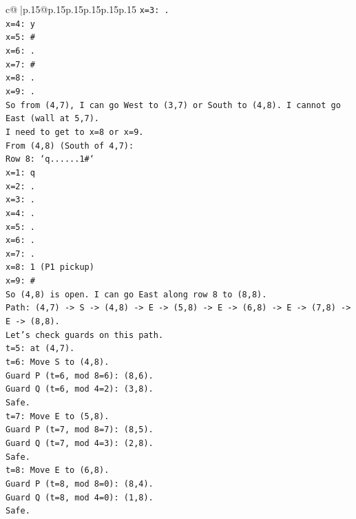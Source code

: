 \documentclass{article}
\begin{document}
{\begin{supertabular}{c@{$\;$}|p{.15\linewidth}@{}p{.15\linewidth}p{.15\linewidth}p{.15\linewidth}p{.15\linewidth}p{.15\linewidth}}
{{{\texttt{x=3: .} \\
\texttt{x=4: y} \\
\texttt{x=5: \#} \\
\texttt{x=6: .} \\
\texttt{x=7: \#} \\
\texttt{x=8: .} \\
\texttt{x=9: .} \\
\texttt{So from (4,7), I can go West to (3,7) or South to (4,8). I cannot go East (wall at 5,7).} \\
\texttt{I need to get to x=8 or x=9.} \\
\texttt{From (4,8) (South of 4,7):} \\
\texttt{Row 8: `q......1\#`} \\
\texttt{x=1: q} \\
\texttt{x=2: .} \\
\texttt{x=3: .} \\
\texttt{x=4: .} \\
\texttt{x=5: .} \\
\texttt{x=6: .} \\
\texttt{x=7: .} \\
\texttt{x=8: 1 (P1 pickup)} \\
\texttt{x=9: \#} \\
\texttt{So (4,8) is open. I can go East along row 8 to (8,8).} \\
\texttt{Path: (4,7) {-}> S {-}> (4,8) {-}> E {-}> (5,8) {-}> E {-}> (6,8) {-}> E {-}> (7,8) {-}> E {-}> (8,8).} \\
\texttt{Let's check guards on this path.} \\
\texttt{t=5: at (4,7).} \\
\texttt{t=6: Move S to (4,8).} \\
\texttt{Guard P (t=6, mod 8=6): (8,6).} \\
\texttt{Guard Q (t=6, mod 4=2): (3,8).} \\
\texttt{Safe.} \\
\texttt{t=7: Move E to (5,8).} \\
\texttt{Guard P (t=7, mod 8=7): (8,5).} \\
\texttt{Guard Q (t=7, mod 4=3): (2,8).} \\
\texttt{Safe.} \\
\texttt{t=8: Move E to (6,8).} \\
\texttt{Guard P (t=8, mod 8=0): (8,4).} \\
\texttt{Guard Q (t=8, mod 4=0): (1,8).} \\
\texttt{Safe.} \\
}}}
\end{supertabular}}
\end{document}
